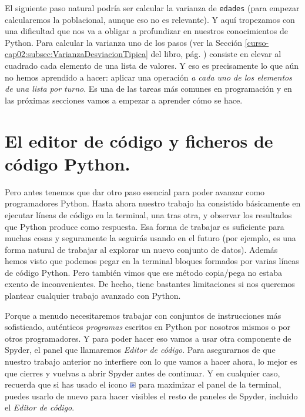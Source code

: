 \documentclass[10pt,a4paper]{article}\usepackage[]{graphicx}\usepackage[]{color}
\newcounter {cont01}
\begin{document}
El siguiente paso natural podría ser calcular la varianza de {\tt edades} (para empezar calcularemos la poblacional, aunque eso no es relevante). Y aquí tropezamos con una dificultad que nos va a obligar a profundizar en nuestros conocimientos de Python. Para calcular la varianza uno de los pasos (ver la Sección \ref{curso-cap02:subsec:VarianzaDesviacionTipica} del libro, pág. \pageref{curso-cap02:subsec:VarianzaDesviacionTipica}) consiste en elevar al cuadrado cada elemento de una lista de valores. Y eso es precisamente lo que aún no hemos aprendido a hacer: aplicar una operación {\em a cada uno de los elementos de una lista por turno}. Es una de las tareas más comunes en programación y en las próximas secciones vamos a empezar a aprender cómo se hace.

\section{El editor de código y ficheros de código Python.}
\label{tut02:sec:ficherosComandosPython}

Pero antes tenemos que dar otro paso esencial para poder avanzar como programadores Python. Hasta ahora nuestro trabajo ha consistido básicamente en ejecutar líneas de código en la terminal, una tras otra, y observar los resultados que Python produce como respuesta. Esa forma de trabajar es suficiente para muchas cosas y seguramente la seguirás usando en el futuro (por ejemplo, es una forma natural de trabajar al explorar un nuevo conjunto de datos). Además hemos visto que podemos pegar en la terminal bloques formados por varias líneas de código Python. Pero también vimos que ese método copia/pega no estaba exento de inconvenientes. De hecho, tiene bastantes limitaciones si nos queremos plantear cualquier trabajo avanzado con Python.

Porque a menudo necesitaremos trabajar con conjuntos de instrucciones más sofisticado, auténticos {\em programas} escritos en Python por nosotros mismos o por otros programadores. Y para poder hacer eso vamos a usar otra componente de Spyder, el panel que llamaremos {\em Editor de código}. Para asegurarnos de que nuestro trabajo anterior no interfiere con lo que vamos a hacer ahora, lo mejor es que cierres y vuelvas a abrir Spyder antes de continuar. Y en cualquier caso, recuerda que si has usado el icono \includegraphics[height=0.25cm]{../fig/Tut-02-py-19-IconoMaximizarPanel.png} para maximizar el panel de la terminal, puedes usarlo de nuevo para hacer visibles el resto de paneles de Spyder, incluido el {\em Editor de código}.
\end{document}
